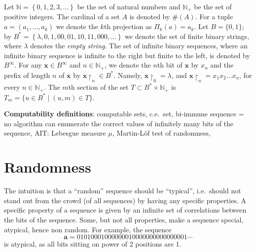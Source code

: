 \documentclass[%
 preprint,
 showpacs,
 showkeys,
 preprintnumbers,
  amsmath,amssymb,
  aps,
 pra,
  longbibliography,
  floatfix,
 ]{revtex4-1}
\theoremstyle{plain}
\newcommand{\rest}[2]{#1\!\!\restriction_{#2}}
\newcommand{\N}{\mathbb{N}}%
\newcommand{\Q}{\mathbb{Q}}%
\newcommand{\R}{\mathbb{R}}%
\newcommand{\B}{B^*}%
\newcommand{\BI}{B^\infty}%
\newcommand{\x}{\mathbf{x}}
\begin{document}
Let $\N=\left\{0,1,2,3,\dotsc\right\}$ be the set of natural numbers
and
$\N_{+}$ be the set of positive integers.
The cardinal of a  set $A$ is denoted by $\#(A)$.
For a tuple $a=(a_1,\dots,a_k)$ we denote the $k$th projection as $\Pi_k(a)=a_k$.
Let $B=\{0,1\}$; by $\B =
\left\{
   \lambda,0,1,00,01,10,11,000,\dotsc
\right\}$
we denote the set of finite binary strings, where $\lambda$ denotes the \emph{empty string}.
The set of infinite binary sequences, where an infinite binary sequence is infinite to the right but finite to the left, is denoted by $\BI$.
For any
$\x \in \BI$
and $n\in\N_{+}$, we denote the $n$th bit of $\x$ by $x_{n}$ and the prefix of length
$n$ of $\x$ by $\rest{\x}{n}\in\B$.
Namely, $\rest{\x}{0}=\lambda$, and
$\rest{\x}{n}=x_{1}x_{2}\dots x_{n}$,
for every $n\in\N_{+}$.
The $m$th section of the set $T \subset \B \times \N_{+}$ is  $T_{m}= \{u \in \B\mid (u,m)\in T\}$.

\medskip

{\bf Computability definitions}: computable sets, c.e.\ set, bi-immune sequence =   no algorithm can enumerate the correct values of infinitely many bits of the sequence,
AIT:   Lebesgue measure $\mu$, Martin-L\"of test of randomness,


\section{Randomness}
 \label{sec:srand}


 The intuition is that a ``random'' sequence should be
 ``typical'',
i.e.\ should not stand out from the crowd (of all sequences) by having any specific properties. A specific  property of a sequence
is given by an infinite set of correlations between the bits of the sequence. Some, but not all properties, make a sequence special, atypical, hence non random. For example, the sequence $${\mathbf a}=01010001000000010000000000000001\cdots$$ is atypical,   as all  bits sitting on power of 2 positions   are 1.
\end{document}
